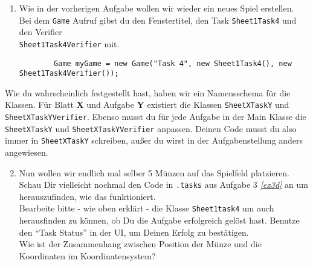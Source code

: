 
\def\PlayFieldModifierDocLinkSuffix{de.unistuttgart.informatik.fius.icge.simulation/de/unistuttgart/informatik/fius/icge/simulation/tools/PlayfieldModifier.html}

\label{ex4}

\begin{enumerate}
    \item Wie in der vorherigen Aufgabe wollen wir wieder ein neues Spiel erstellen.\\
    Bei dem \lstinline{Game} Aufruf gibst du den Fenstertitel, den Task \lstinline{Sheet1Task4} und den Verifier\\\lstinline{Sheet1Task4Verifier} mit.

    \begin{lstlisting}
		Game myGame = new Game("Task 4", new Sheet1Task4(), new Sheet1Task4Verifier());
    \end{lstlisting}
\end{enumerate}

\begin{Infobox}
    Wie du wahrscheinlich festgestellt hast, haben wir ein Namensschema für die Klassen.\newline
    Für Blatt \textbf{X} und Aufgabe \textbf{Y} existiert die Klassen \lstinline{SheetXTaskY} und \lstinline{SheetXTaskYVerifier}.\newline
    Ebenso musst du für jede Aufgabe in der Main Klasse die \lstinline{SheetXTaskY} und \lstinline{SheetXTaskYVerifier} anpassen.
    Deinen Code musst du also immer in \lstinline{SheetXTaskY} schreiben, außer du wirst in der Aufgabenstellung anders angewiesen.
\end{Infobox}

\begin{enumerate}
	\setcounter{enumi}{1}
    \item Nun wollen wir endlich mal selber 5 Münzen auf das Spielfeld platzieren.
	Schau Dir vielleicht nochmal den Code in \texttt{\javaPackageName.tasks} aus Aufgabe 3 \textit{\ref{ex3d}} an um herauszufinden, wie das funktioniert.\\
	Bearbeite bitte - wie oben erklärt - die Klasse \lstinline{Sheet1task4} um auch herausfinden zu können, ob Du die Aufgabe erfolgreich gelöst hast. Benutze den \enquote{Task Status} in der UI, um Deinen Erfolg zu bestätigen.\\
	Wie ist der Zusammenhang zwischen Position der Münze und die Koordinaten im Koordinatensystem?
\end{enumerate}

